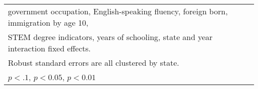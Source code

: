 \begin{table}[htbp]
\begin{tabular}{l*{3}{c}}
\multicolumn{4}{l}{\footnotesize government occupation, English-speaking fluency, foreign born, immigration by age 10,}\\
\multicolumn{4}{l}{\footnotesize STEM degree indicators, years of schooling, state and year interaction fixed effects.}\\
\multicolumn{4}{l}{\footnotesize Robust standard errors are all clustered by state.}\\
\multicolumn{4}{l}{\footnotesize \sym{*} \(p<.1\), \sym{**} \(p<0.05\), \sym{***} \(p<0.01\)}\\
\end{tabular}
\end{table}
